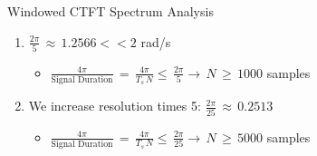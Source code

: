 \begin{frame}[t,allowframebreaks]{Windowed CTFT Spectrum Analysis}
\begin{itemize}
	\begin{enumerate}
	\item $\displaystyle\frac{2 \pi}{5} \, \approx \, 1.2566 <<  2$ rad/s
	
		\begin{itemize}
		\item $\displaystyle\frac{4 \pi}{\text{Signal Duration}} \, = \,   \displaystyle\frac{4 \pi}{T_s \, N} \leq \, \displaystyle\frac{2 \pi}{5} \rightarrow \, N \, \geq \, 1000 $ samples
		\end{itemize}
		
	\item We increase resolution times 5: $\displaystyle\frac{2 \pi}{25} \, \approx \, 0.2513$
	
	\begin{itemize}
		\item $\displaystyle\frac{4 \pi}{\text{Signal Duration}} \, = \,   \displaystyle\frac{4 \pi}{T_s \, N} \leq \, \displaystyle\frac{2 \pi}{25} \rightarrow \, N \, \geq \, 5000 $ samples
		\end{itemize}

	\end{enumerate}

\end{itemize}



\end{frame}



